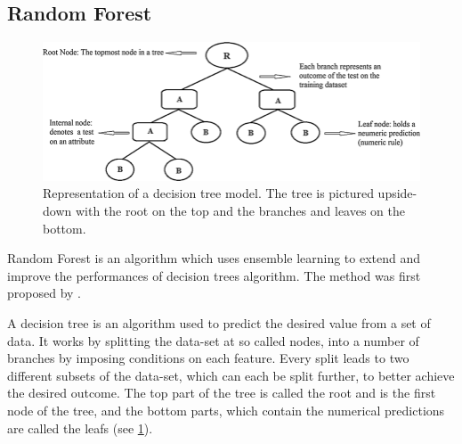 \subsection{Random Forest}\label{random-forest}
\begin{figure}[!tp]
	\centering		  
	\includegraphics[width=1.\textwidth]{figures/decision_tree.png}
	\caption{Representation of a decision tree model. The tree is pictured upside-down with the root on the top and the branches and leaves on the bottom.}
	\label{fig:tree}
\end{figure}
Random Forest is an algorithm which uses ensemble learning to extend and improve the performances of decision trees algorithm. The method was first proposed by \citet{RandomHo1995}. 

A decision tree is an algorithm used to predict the desired value from a set of data. It works by splitting the data-set at so called nodes, into a number of branches by imposing conditions on each feature. Every split leads to two different subsets of the data-set, which can each be split further, to better achieve the desired outcome. The top part of the tree is called the root and is the first node of the tree, and the bottom parts, which contain the numerical predictions are called the leafs (see \ref{fig:tree}).

